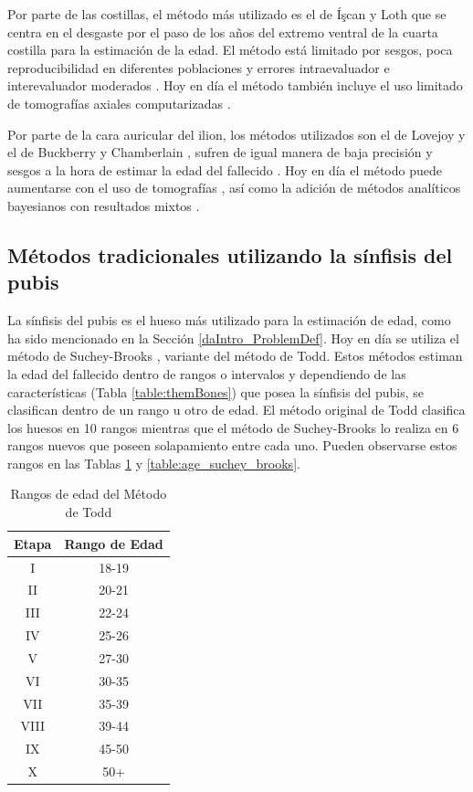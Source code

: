 Por parte de las costillas, el método más utilizado es el de Íşcan y Loth \cite{icscan1984age, icscan1985age} que se centra en el desgaste por el paso de los años del extremo ventral de la cuarta costilla para la estimación de la edad. El método está limitado por sesgos, poca reproducibilidad en diferentes poblaciones y errores intraevaluador e interevaluador moderados \cite{fanton2010critical, hartnett2010analysis}. Hoy en día el método también incluye el uso limitado de tomografías axiales computarizadas \cite{blaszkowska2019validation}.

Por parte de la cara auricular del ilion, los métodos utilizados son el  de Lovejoy \cite{lovejoy1985chronological} y el de Buckberry y Chamberlain \cite{buckberry_age_2002}, sufren de igual manera de baja precisión y sesgos a la hora de estimar la edad del fallecido \cite{falys2006auricular, michopoulou2017auricular}. Hoy en día el método puede aumentarse con el uso de tomografías \cite{villa2013reliability, barrier2009age}, así como la adición de métodos analíticos bayesianos con resultados mixtos \cite{nikita2018evaluation}. 

\subsection{Métodos tradicionales utilizando la sínfisis del pubis}

La sínfisis del pubis es el hueso más utilizado para la estimación de edad, como ha sido mencionado en la Sección \ref{daIntro_ProblemDef}. Hoy en día se utiliza el método de Suchey-Brooks \cite{RefWorks:RefID:20-brooks1990skeletal}, variante del método de Todd. Estos métodos estiman la edad del fallecido dentro de rangos o intervalos y dependiendo de las características (Tabla \ref{table:themBones}) que posea la sínfisis del pubis, se clasifican dentro de un rango u otro de edad. El método original de Todd clasifica los huesos en 10 rangos mientras que el método de Suchey-Brooks lo realiza en 6 rangos nuevos que poseen solapamiento entre cada uno. Pueden observarse estos rangos en las Tablas \ref{table:age_todd_} y \ref{table:age_suchey_brooks}.

\begin{table}[h]
\centering
\begin{tabular}{|c|c|}
\hline
\rowcolor[HTML]{FFCB2F} 
{Etapa} & {Rango de Edad} \\ \hline
I & 18-19 \\ \hline
II & 20-21 \\ \hline
III & 22-24 \\ \hline
IV & 25-26 \\ \hline
V & 27-30 \\ \hline
VI & 30-35 \\ \hline
VII & 35-39 \\ \hline
VIII & 39-44 \\ \hline
IX & 45-50 \\ \hline
X & 50+ \\ \hline
\end{tabular}
\caption{Rangos de edad del Método de Todd}
\label{table:age_todd_}
\end{table}

